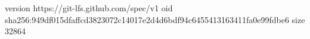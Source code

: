 version https://git-lfs.github.com/spec/v1
oid sha256:949df015dfaffcd3823072c14017e2d4d6bdf94c6455413163411fa0e99fdbe6
size 32864
